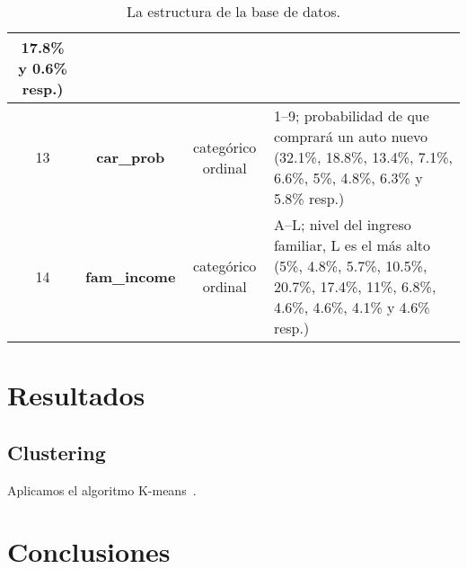 \documentclass[letterpaper,11pt]{article}
\begin{document}
\begin{table}
\begin{center}
{\begin{tabular}{|c|c|c|p{8cm}|}
{    17.8\% y 0.6\% resp.)}\\
    \hline 
    13 &\bf car\_prob & categórico ordinal & 1--9; probabilidad de que comprará un auto nuevo {\footnotesize (32.1\%,
    18.8\%, 13.4\%, 7.1\%, 6.6\%, 5\%, 4.8\%, 6.3\% y 5.8\% resp.)}\\
    \hline 
    14 &\bf fam\_income & categórico ordinal & A--L; nivel del ingreso familiar, L es el más alto {\footnotesize (5\%,
    4.8\%, 5.7\%, 10.5\%, 20.7\%, 17.4\%, 11\%, 6.8\%, 4.6\%, 4.6\%, 4.1\% y 4.6\% resp.)}\\
    \hline
\end{tabular}}
\end{center}
\caption{\small La estructura de la base de datos.}
\label{tab:1}
\end{table}

\begin{multicols}{2}
\section{Resultados}

\subsection*{Clustering} Aplicamos el algoritmo K-means~\cite[Capítulo 13]{book2}.
\section{Conclusiones}


\end{multicols}
\end{document}
